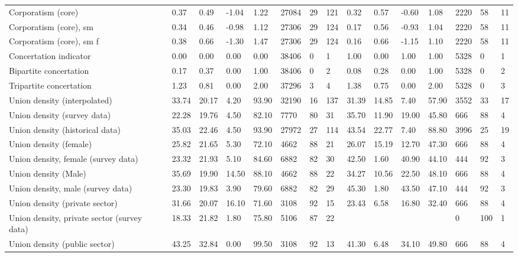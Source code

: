 \begin{longtable}{lllllllllllllll}
Corporatism (core) & 0.37 & 0.49 & -1.04 & 1.22 & 27084 & 29 & 121 & 0.32 & 0.57 & -0.60 & 1.08 & 2220 & 58 & 11\\
\addlinespace
Corporatism (core), sm & 0.34 & 0.46 & -0.98 & 1.12 & 27306 & 29 & 124 & 0.17 & 0.56 & -0.93 & 1.04 & 2220 & 58 & 11\\
Corporatism (core), sm f & 0.38 & 0.66 & -1.30 & 1.47 & 27306 & 29 & 124 & 0.16 & 0.66 & -1.15 & 1.10 & 2220 & 58 & 11\\
Concertation indicator & 0.00 & 0.00 & 0.00 & 0.00 & 38406 & 0 & 1 & 1.00 & 0.00 & 1.00 & 1.00 & 5328 & 0 & 1\\
Bipartite concertation & 0.17 & 0.37 & 0.00 & 1.00 & 38406 & 0 & 2 & 0.08 & 0.28 & 0.00 & 1.00 & 5328 & 0 & 2\\
Tripartite concertation & 1.23 & 0.81 & 0.00 & 2.00 & 37296 & 3 & 4 & 1.38 & 0.75 & 0.00 & 2.00 & 5328 & 0 & 3\\
\addlinespace
Union density (interpolated) & 33.74 & 20.17 & 4.20 & 93.90 & 32190 & 16 & 137 & 31.39 & 14.85 & 7.40 & 57.90 & 3552 & 33 & 17\\
Union density (survey data) & 22.28 & 19.76 & 4.50 & 82.10 & 7770 & 80 & 31 & 35.70 & 11.90 & 19.00 & 45.80 & 666 & 88 & 4\\
Union density (historical data) & 35.03 & 22.46 & 4.50 & 93.90 & 27972 & 27 & 114 & 43.54 & 22.77 & 7.40 & 88.80 & 3996 & 25 & 19\\
Union density (female) & 25.82 & 21.65 & 5.30 & 72.10 & 4662 & 88 & 21 & 26.07 & 15.19 & 12.70 & 47.30 & 666 & 88 & 4\\
Union density, female (survey data) & 23.32 & 21.93 & 5.10 & 84.60 & 6882 & 82 & 30 & 42.50 & 1.60 & 40.90 & 44.10 & 444 & 92 & 3\\
\addlinespace
Union density (Male) & 35.69 & 19.90 & 14.50 & 88.10 & 4662 & 88 & 22 & 34.27 & 10.56 & 22.50 & 48.10 & 666 & 88 & 4\\
Union density, male (survey data) & 23.30 & 19.83 & 3.90 & 79.60 & 6882 & 82 & 29 & 45.30 & 1.80 & 43.50 & 47.10 & 444 & 92 & 3\\
Union density (private sector) & 31.66 & 20.07 & 16.10 & 71.60 & 3108 & 92 & 15 & 23.43 & 6.58 & 16.80 & 32.40 & 666 & 88 & 4\\
Union density, private sector (survey data) & 18.33 & 21.82 & 1.80 & 75.80 & 5106 & 87 & 22 &  &  &  &  & 0 & 100 & 1\\
Union density (public sector) & 43.25 & 32.84 & 0.00 & 99.50 & 3108 & 92 & 13 & 41.30 & 6.48 & 34.10 & 49.80 & 666 & 88 & 4\\

\end{longtable}
